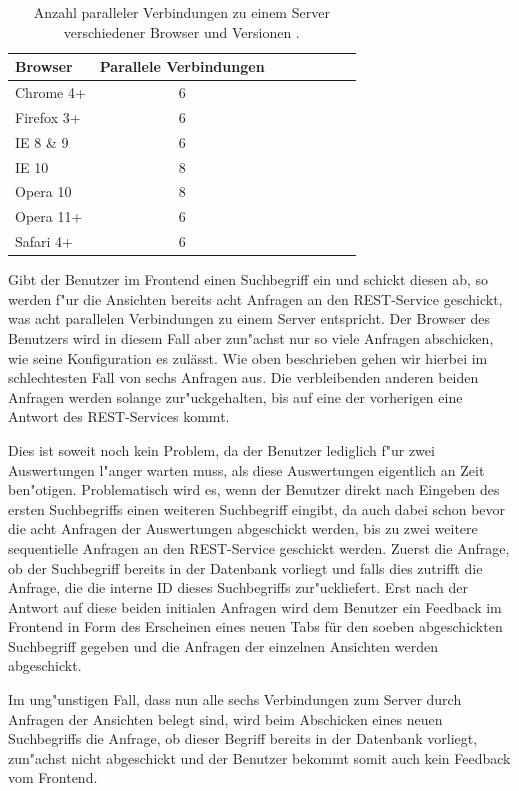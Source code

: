 \begin{table}[ht]
\centering
\small
\begin{tabular}{l | c c c c c c c}
\toprule
Browser & Parallele Verbindungen\\
\midrule
Chrome 4+ & 6\\
Firefox 3+ & 6\\
IE 8 \& 9 & 6\\
IE 10 & 8\\
Opera 10 & 8\\
Opera 11+ & 6\\
Safari 4+ & 6\\ 
\bottomrule
\end{tabular} 
\caption{Anzahl paralleler Verbindungen zu einem Server verschiedener Browser und Versionen \cite{BrowserScope}.}
\label{fig:ConPoolTab}
\end{table}

Gibt der Benutzer im Frontend einen Suchbegriff ein und schickt diesen ab, so werden f"ur die Ansichten bereits acht Anfragen an den REST-Service geschickt, was  acht parallelen Verbindungen zu einem Server entspricht. Der Browser des Benutzers wird in diesem Fall aber zun"achst nur so viele Anfragen abschicken, wie seine Konfiguration es zulässt. Wie oben beschrieben gehen wir hierbei im schlechtesten Fall von sechs Anfragen aus. Die verbleibenden anderen beiden Anfragen werden solange zur"uckgehalten, bis auf eine der vorherigen eine Antwort des REST-Services kommt.

Dies ist soweit noch kein Problem, da der Benutzer lediglich f"ur zwei Auswertungen l"anger warten muss, als diese Auswertungen eigentlich an Zeit ben"otigen. Problematisch wird es, wenn der Benutzer direkt nach Eingeben des ersten Suchbegriffs einen weiteren Suchbegriff eingibt, da auch dabei schon bevor die acht Anfragen der Auswertungen abgeschickt werden, bis zu zwei weitere sequentielle Anfragen an den REST-Service geschickt werden. Zuerst die Anfrage, ob der Suchbegriff bereits in der Datenbank vorliegt und falls dies zutrifft die Anfrage, die die interne ID dieses Suchbegriffs zur"uckliefert. Erst nach der Antwort auf diese beiden initialen Anfragen wird dem Benutzer ein Feedback im Frontend in Form des Erscheinen eines neuen Tabs für den soeben abgeschickten Suchbegriff gegeben und die Anfragen der einzelnen Ansichten werden abgeschickt.

Im ung"unstigen Fall, dass nun alle sechs Verbindungen zum Server durch Anfragen der Ansichten belegt sind, wird beim Abschicken eines neuen Suchbegriffs die Anfrage, ob dieser Begriff bereits in der Datenbank vorliegt, zun"achst nicht abgeschickt und der Benutzer bekommt somit auch kein Feedback vom Frontend.

